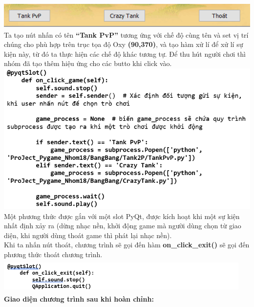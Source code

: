 \documentclass[a4paper]{article}
\begin{document}
\includegraphics[width=5.66528in,height=0.53194in]{image3.png}\vspace{1em}\\
Ta tạo nút nhấn có tên \textbf{``Tank PvP''} tương ứng với chế độ cùng tên và set vị trí chúng cho phù hợp trên trục tọa độ Oxy \textbf{(90,370)}, và tạo hàm xử lí để xử lí sự kiện này, từ đó ta thực hiện các chế độ khác tương tự. Để
thu hút người chơi thì nhóm đã tạo thêm hiệu ứng cho các butto khi click
vào.\vspace{1em}\\
\includegraphics[width=6in,height=3in]{image3_2.png}\vspace{1em}\\
Một phương thức được gắn với một slot PyQt, được kích hoạt khi một sự
kiện nhất định xảy ra (dừng nhạc nền, khởi động game mà người dùng chọn
từ giao diện, khi người dùng thoát game thì phát lại nhạc nền).\\
Khi ta nhấn nút thoát, chương trình sẽ gọi đến hàm
\textbf{on\_click\_exit()} sẽ gọi đến phương thức thoát chương trình.\vspace{1em}\\
\includegraphics[width=5in,height=0.7in]{image3_3.png}\vspace{1em}\\
\textbf{Giao diện chương trình sau khi hoàn chỉnh:}\vspace{1em}\\
\end{document}
